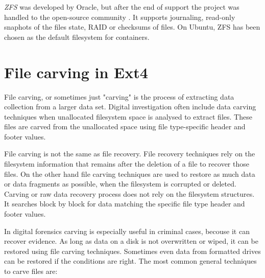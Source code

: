 \documentclass{acm_proc_article-sp}
\begin{document}
{\it ZFS} \cite{zfs} was developed by Oracle, but after the end of support the project was handled to the open-source community \cite{openzfs}. It supports journaling, read-only snaphots of the files state, RAID or checksums of files. On Ubuntu, ZFS has been chosen as the default filesystem for containers.

\section{File carving in Ext4}

File carving, or sometimes just "carving" is the process of extracting data collection from a larger data set. Digital investigation often include data carving techniques when unallocated filesystem space is analysed to extract files. These files are carved from the unallocated space using file type-specific header and footer values\cite{merola2008data}.

File carving is not the same as file recovery. File recovery techniques rely on the filesystem information that remains after the deletion of a file to recover those files. On the other hand file carving techniques are used to restore as much data or data fragments as possible, when the filesystem is corrupted or deleted. Carving or raw data recovery process does not rely on the filesystem structures. It searches block by block for data matching the specific file type header and footer values\cite{beek2011introduction}. 

In digital forensics carving is especially useful in criminal cases, becouse it can recover evidence. As long as data on a disk is not overwritten or wiped, it can be restored using file carving techniques. Sometimes even data from formatted drives can be restored if the conditions are right. The most common general techniques to carve files are\cite{hadi2016reviewing}:
\end{document}
